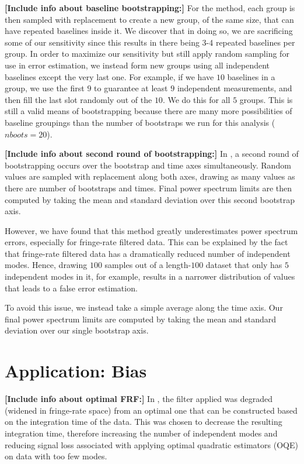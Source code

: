 \documentclass[preprint2,numberedappendix,tighten,twocolappendix]{aastex6}  %
\newcommand{\cc}[1]{{\color{purple} \textbf{[#1]}}}
\begin{document}
\cc{Include info about baseline bootstrapping:}
For the \citet{ali_et_al2015} method, each group is then sampled with replacement to create a new group, of the same size, that can have repeated baselines inside it. We discover that in doing so, we are sacrificing some of our sensitivity since this results in there being 3-4 repeated baselines per group. In order to maximize our sensitivity but still apply random sampling for use in error estimation, we instead form new groups using all independent baselines except the very last one. For example, if we have $10$ baselines in a group, we use the first $9$ to guarantee at least $9$ independent measurements, and then fill the last slot randomly out of the $10$. We do this for all $5$ groups. This is still a valid means of bootstrapping because there are many more possibilities of baseline groupings than the number of bootstraps we run for this analysis ($nboots = 20$).

\cc{Include info about second round of bootstrapping:}
In \citet{ali_et_al2015}, a second round of bootstrapping occurs over the bootstrap and time axes simultaneously. Random values are sampled with replacement along both axes, drawing as many values as there are number of bootstraps and times. Final power spectrum limits are then computed by taking the mean and standard deviation over this second bootstrap axis. 

However, we have found that this method greatly underestimates power spectrum errors, especially for fringe-rate filtered data. This can be explained by the fact that fringe-rate filtered data has a dramatically reduced number of independent modes. Hence, drawing $100$ samples out of a length-$100$ dataset that only has $5$ independent modes in it, for example, results in a narrower distribution of values that leads to a false error estimation.

To avoid this issue, we instead take a simple average along the time axis. Our final power spectrum limits are computed by taking the mean and standard deviation over our single bootstrap axis. 


\section{Application: Bias}
\label{sec:Bias}

\cc{Include info about optimal FRF:}
In \citet{ali_et_al2015}, the filter applied was degraded (widened in fringe-rate space) from an optimal one that can be constructed based on the integration time of the data. This was chosen to decrease the resulting integration time, therefore increasing the number of independent modes and reducing signal loss associated with applying optimal quadratic estimators (OQE) on data with too few modes.
\end{document}
